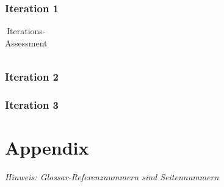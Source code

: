 \documentclass[11pt,ngerman]{article}
\begin{document}
    \subsubsection{Iteration 1}
    \begin{table}[H]
        \caption{Iterations-Assessment}
        \begin{tabularx}{\textwidth}{X}
            \toprule

            \bottomrule
        \end{tabularx}
        \label{tab:Iterations-Assessment: Iteration 1}
    \end{table}

    \subsubsection{Iteration 2}

    \subsubsection{Iteration 3}

     \newpage

    \section{Appendix}
    \textit{Hinweis: Glossar-Referenznummern sind Seitennummern}
    \printglossary
\end{document}
